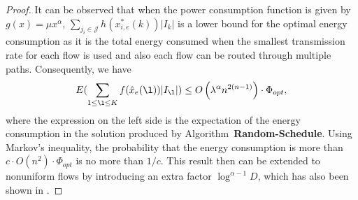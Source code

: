 \documentclass[10pt, conference, compsocconf]{IEEEtran}
\begin{document}
\begin{proof}
It can be observed that when the power consumption function is given by $g(x)=\mu x^{\alpha}$, $\sum_{j_i \in \mathcal{J}} h(x^*_{i,e}(k))|I_k|$ is a lower bound for the optimal energy consumption as it is the total energy consumed when the smallest transmission rate for each flow is used and also each flow can be routed through multiple paths. Consequently, we have
\begin{equation}
E(\sum_{1\leq \l \leq K}f(\hat{x}_e(\l)) |I_{\l}|)\leq O\left(\lambda^{\alpha} n^{2(n-1)}\right)\cdot \Phi_{opt}, 
\end{equation}
where the expression on the left side is the expectation of the energy consumption in the solution produced by Algorithm~\textbf{Random-Schedule}. Using Markov's inequality, the probability that the energy consumption is more than $c\cdot O(n^2)\cdot \Phi_{opt}$ is no more than $1/c$. This result then can be extended to nonuniform flows by introducing an extra factor $\log^{\alpha-1}D$, which has also been shown in \cite{Andrews_Fernandez-SS-2010}.
\end{proof}
\end{document}
